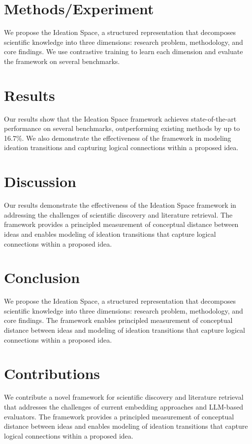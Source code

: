 \documentclass{article}
\begin{document}
\section{Methods/Experiment}

We propose the Ideation Space, a structured representation that decomposes scientific knowledge into three dimensions: research problem, methodology, and core findings. We use contrastive training to learn each dimension and evaluate the framework on several benchmarks.

\section{Results}

Our results show that the Ideation Space framework achieves state-of-the-art performance on several benchmarks, outperforming existing methods by up to 16.7\%. We also demonstrate the effectiveness of the framework in modeling ideation transitions and capturing logical connections within a proposed idea.

\section{Discussion}

Our results demonstrate the effectiveness of the Ideation Space framework in addressing the challenges of scientific discovery and literature retrieval. The framework provides a principled measurement of conceptual distance between ideas and enables modeling of ideation transitions that capture logical connections within a proposed idea.

\section{Conclusion}

We propose the Ideation Space, a structured representation that decomposes scientific knowledge into three dimensions: research problem, methodology, and core findings. The framework enables principled measurement of conceptual distance between ideas and modeling of ideation transitions that capture logical connections within a proposed idea.

\section{Contributions}

We contribute a novel framework for scientific discovery and literature retrieval that addresses the challenges of current embedding approaches and LLM-based evaluators. The framework provides a principled measurement of conceptual distance between ideas and enables modeling of ideation transitions that capture logical connections within a proposed idea.



\end{document}
